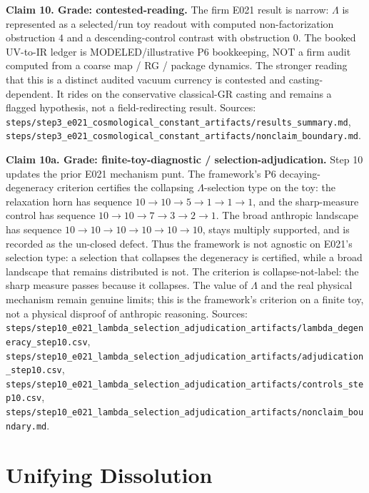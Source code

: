 \documentclass[11pt]{article}
\begin{document}
\textbf{Claim 10. Grade: contested-reading.}
The firm E021 result is narrow: \(\Lambda\) is represented as a selected/run toy readout with computed non-factorization obstruction \(4\) and a descending-control contrast with obstruction \(0\). The booked UV-to-IR ledger is MODELED/illustrative P6 bookkeeping, NOT a firm audit computed from a coarse map / RG / package dynamics. The stronger reading that this is a distinct audited vacuum currency is contested and casting-dependent. It rides on the conservative classical-GR casting and remains a flagged hypothesis, not a field-redirecting result.
Sources: \texttt{steps/step3\_e021\_cosmological\_constant\_artifacts/results\_summary.md}, \texttt{steps/step3\_e021\_cosmological\_constant\_artifacts/nonclaim\_boundary.md}.

\textbf{Claim 10a. Grade: finite-toy-diagnostic / selection-adjudication.}
Step 10 updates the prior E021 mechanism punt. The framework's P6 decaying-degeneracy criterion certifies the collapsing \(\Lambda\)-selection type on the toy: the relaxation horn has sequence \(10\to10\to5\to1\to1\to1\), and the sharp-measure control has sequence \(10\to10\to7\to3\to2\to1\). The broad anthropic landscape has sequence \(10\to10\to10\to10\to10\to10\), stays multiply supported, and is recorded as the un-closed defect. Thus the framework is not agnostic on E021's selection type: a selection that collapses the degeneracy is certified, while a broad landscape that remains distributed is not. The criterion is collapse-not-label: the sharp measure passes because it collapses. The value of \(\Lambda\) and the real physical mechanism remain genuine limits; this is the framework's criterion on a finite toy, not a physical disproof of anthropic reasoning.
Sources: \texttt{steps/step10\_e021\_lambda\_selection\_adjudication\_artifacts/lambda\_degeneracy\_step10.csv}, \texttt{steps/step10\_e021\_lambda\_selection\_adjudication\_artifacts/adjudication\_step10.csv}, \texttt{steps/step10\_e021\_lambda\_selection\_adjudication\_artifacts/controls\_step10.csv}, \texttt{steps/step10\_e021\_lambda\_selection\_adjudication\_artifacts/nonclaim\_boundary.md}.

\section{Unifying Dissolution}
\end{document}
